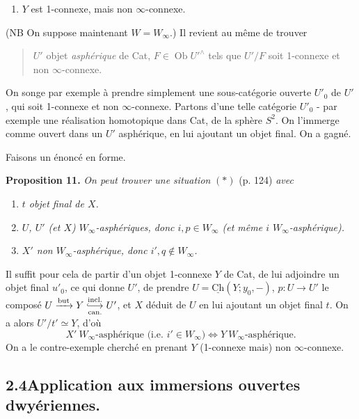 \documentclass[11pt]{article}
\newcommand{\printedpage}[1]{\marginpar{\footnotesize p.~#1}}
\newcommand{\msp}[1]{\marginpar{\footnotesize [#1]}}
\newcommand{\hra}{\lhook\joinrel\longrightarrow}
\begin{document}
\begin{enumerate}[label=\alph*), start=3]
\item \printedpage{74}
$Y$ est 1-connexe, mais non $\infty$-connexe.
\end{enumerate}

(NB On suppose maintenant $W=W_\infty$.) Il revient au même de trouver

\begin{quote}
$U'$ objet \textit{asphérique} de Cat, $F\in\operatorname{Ob}U'^\wedge$ tels que $U'/F$ soit 1-connexe et non $\infty$-connexe.
\end{quote}

On songe par exemple à prendre simplement une sous-catégorie ouverte $U'_0$ de $U'$, qui soit 1-connexe et non $\infty$-connexe. Partons d'une telle catégorie $U'_0$ - par exemple une réalisation homotopique dans Cat, de la sphère $S^2$. On l'immerge comme ouvert dans un $U'$ asphérique, en lui ajoutant un objet final. On a gagné.

\msp{page 107}

Faisons un énoncé en forme.

\textbf{Proposition 11.} \textit{On peut trouver une situation} $(*)$ (p. 124) \textit{avec}

\begin{enumerate}[label=\textit{\alph*)}]
\item \textit{$t$ objet final de $X$.}
\item \textit{$U$, $U'$ (et $X$) $W_\infty$-asphériques, donc $i,p\in W_\infty$ (et même $i$ $W_\infty$-asphérique).}
\item \textit{$X'$ non $W_\infty$-asphérique, donc $i',q\notin W_\infty$.}
\end{enumerate}

Il suffit pour cela de partir d'un objet 1-connexe $Y$ de Cat, de lui adjoindre un objet final $u'_0$, ce qui donne $U'$, de prendre $U=\underline{\mathrm{Ch}}(Y;y_0,-)$, $p:U\longrightarrow U'$ le composé $U\xrightarrow{\text{but}}Y\underset{\text{can.}}{\overset{\text{incl.}}{\hra}}U'$, et $X$ déduit de $U$ en lui ajoutant un objet final $t$. On a alors $U'/t'\simeq Y$, d'où
\[ X'\ W_\infty\text{-asphérique (i.e. }i'\in W_\infty)\Longleftrightarrow Y\ W_\infty\text{-asphérique.} \]
On a le contre-exemple cherché en prenant $Y$ (1-connexe mais) non $\infty$-connexe.

\subsection*{2.4\quad Application aux immersions ouvertes dwyériennes.}
\end{document}
